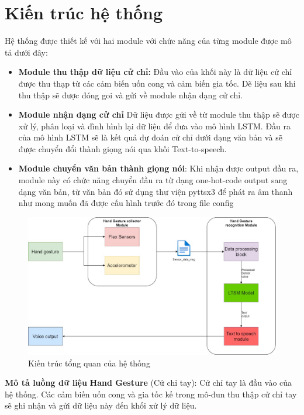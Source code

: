 \section{Kiến trúc hệ thống}
Hệ thống được thiết kế với hai module với chức năng của từng module được mô tả dưới đây:
\begin{itemize}
    \item \textbf{Module thu thập dữ liệu cử chỉ:} Đầu vào của khối này là dữ liệu cử chỉ được thu thạp từ các cảm biến uốn cong và cảm biến gia tốc. Dẽ liệu sau khi thu thập sẽ được đóng goi và gửi về module nhận dạng cử chỉ.
    \item \textbf{Module nhận dạng cử chỉ} Dữ liệu được gửi về từ module thu thập sẽ được xử lý, phân loại và đình hình lại dữ liệu để đưa vào mô hình LSTM. Đầu ra của mô hình LSTM sẽ là kết quả dự đoán cử chỉ dưới dạng văn bản và sẽ được chuyển đổi thành giọng nói qua khối Text-to-speech.
    \item \textbf{Module chuyển văn bản thành giọng nói}: Khi nhận được output đầu ra, module này có chức năng chuyển đầu ra từ dạng one-hot-code output sang dạng văn bản, từ văn bản đó sử dụng thư viện pyttsx3 để phát ra âm thanh như mong muốn đã được cấu hình trước đó trong file config
\end{itemize}
\begin{figure}[H]
    \centering
    \includegraphics[width=\textwidth,height=\textheight,keepaspectratio]{Images/Theoretical basis/FlexArchitecture.jpg}
    \caption{Kiến trúc tổng quan của hệ thống}
    \label{fig:enter-label}
\end{figure}
\textbf{Mô tả luồng dữ liệu }
\textbf{Hand Gesture} (Cử chỉ tay): Cử chỉ tay là đầu vào của hệ thống. Các cảm biến uốn cong và gia tốc kế trong mô-đun thu thập cử chỉ tay sẽ ghi nhận và gửi dữ liệu này đến khối xử lý dữ liệu.\

